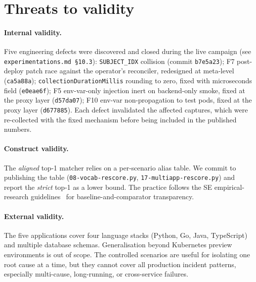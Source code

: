 \documentclass[sigconf, nonacm=true, anonymous=false, review=false]{acmart}
\newcommand{\fn}[1]{F#1\xspace}
\begin{document}
\section{Threats to validity}
\label{sec:threats}

\paragraph{Internal validity.} Five engineering defects were
discovered and closed during the live campaign (see
\texttt{experimentations.md \S{}10.3}): \texttt{SUBJECT\_IDX}
collision (commit \texttt{b7e5a23}); \fn{7} post-deploy patch
race against the operator's reconciler, redesigned at meta-level
(\texttt{ca5a88a}); \texttt{collectionDurationMillis} rounding to
zero, fixed with microseconds field (\texttt{e0eae6f}); \fn{5}
env-var-only injection inert on backend-only smoke, fixed at the
proxy layer (\texttt{d57da07}); \fn{10} env-var non-propagation to
test pods, fixed at the proxy layer (\texttt{d677885}). Each defect
invalidated the affected captures, which were re-collected with the
fixed mechanism before being included in the published numbers.

\paragraph{Construct validity.} The \emph{aligned} top-1 matcher
relies on a per-scenario alias table. We commit to publishing the
table (\texttt{08-vocab-rescore.py}, \texttt{17-multiapp-rescore.py})
and report the \emph{strict} top-1 as a lower bound. The
practice follows the SE empirical-research
guidelines~\cite{kitchenham_2002} for baseline-and-comparator
transparency.

\paragraph{External validity.} The five applications cover four
language stacks (Python, Go, Java, TypeScript) and multiple database
schemas. Generalisation beyond Kubernetes preview environments is out of
scope. The controlled scenarios are useful for isolating one root cause at
a time, but they cannot cover all production incident patterns, especially
multi-cause, long-running, or cross-service failures.
\end{document}
